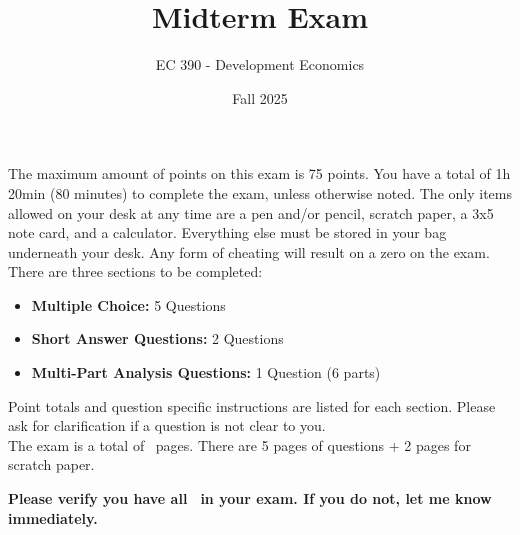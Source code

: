 \documentclass[12pt]{exam}
\title{Midterm Exam}
\author{EC 390 - Development Economics}
\date{Fall 2025}
\begin{document}
\begin{coverpages}

\maketitle

\begin{center}
\end{center}
\vspace{2cm}

\vspace{1cm}
\noindent
The maximum amount of points on this exam is 75 points. 
You have a total of 1h 20min (80 minutes) to complete the exam, unless otherwise noted. 
The only items allowed on your desk at any time are a pen and/or pencil, scratch paper, a 3x5 note card, and a calculator. 
Everything else must be stored in your bag underneath your desk. 
Any form of cheating will result on a zero on the exam.\\

\noindent There are three sections to be completed:

\begin{itemize}
    \item \textbf{Multiple Choice:} 5 Questions
    \item \textbf{Short Answer Questions:} 2 Questions
    \item \textbf{Multi-Part Analysis Questions:} 1 Question (6 parts)
\end{itemize}

\noindent Point totals and question specific instructions are listed for each section.
Please ask for clarification if a question is not clear to you.\\

\noindent The exam is a total of \numpages $\,$ pages. 
There are 5 pages of questions + 2 pages for scratch paper.

\noindent \textbf{Please verify you have all \numpages $\,$ in your exam. If you do not, let me know immediately.}

\end{coverpages}

\end{document}
